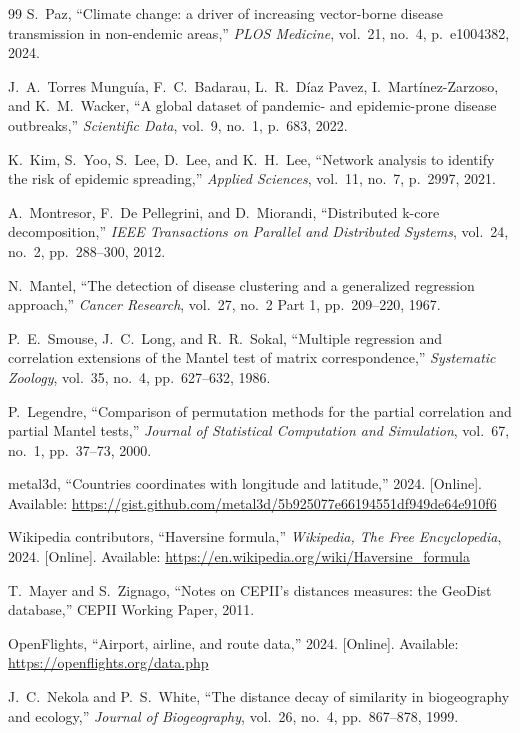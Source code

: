 \documentclass[11pt]{article}
\begin{document}
\begin{thebibliography}{99}
 S.~Paz, ``Climate change: a driver of increasing vector-borne disease
transmission in non-endemic areas,'' \emph{PLOS Medicine}, vol.~21, no.~4, p.~e1004382,
2024.

 J.~A.~Torres Mungu\'{i}a, F.~C.~Badarau, L.~R.~D\'{i}az Pavez,
I.~Mart\'{i}nez-Zarzoso, and K.~M.~Wacker, ``A global dataset of pandemic- and
epidemic-prone disease outbreaks,'' \emph{Scientific Data}, vol.~9, no.~1, p.~683, 2022.

 K.~Kim, S.~Yoo, S.~Lee, D.~Lee, and K.~H.~Lee, ``Network analysis to
identify the risk of epidemic spreading,'' \emph{Applied Sciences}, vol.~11, no.~7, p.~2997,
2021.

 A.~Montresor, F.~De Pellegrini, and D.~Miorandi, ``Distributed
k-core decomposition,'' \emph{IEEE Transactions on Parallel and Distributed Systems},
vol.~24, no.~2, pp.~288--300, 2012.

 N.~Mantel, ``The detection of disease clustering and a generalized
regression approach,'' \emph{Cancer Research}, vol.~27, no.~2 Part 1, pp.~209--220, 1967.

 P.~E.~Smouse, J.~C.~Long, and R.~R.~Sokal, ``Multiple regression and
correlation extensions of the Mantel test of matrix correspondence,'' \emph{Systematic
Zoology}, vol.~35, no.~4, pp.~627--632, 1986.

 P.~Legendre, ``Comparison of permutation methods for the partial
correlation and partial Mantel tests,'' \emph{Journal of Statistical Computation and
Simulation}, vol.~67, no.~1, pp.~37--73, 2000.

 metal3d, ``Countries coordinates with longitude and latitude,'' 2024.
[Online]. Available: \url{https://gist.github.com/metal3d/5b925077e66194551df949de64e910f6}

 Wikipedia contributors, ``Haversine formula,'' \emph{Wikipedia, The
Free Encyclopedia}, 2024. [Online]. Available:
\url{https://en.wikipedia.org/wiki/Haversine_formula}

 T.~Mayer and S.~Zignago, ``Notes on CEPII's distances measures: the
GeoDist database,'' CEPII Working Paper, 2011.

 OpenFlights, ``Airport, airline, and route data,'' 2024. [Online].
Available: \url{https://openflights.org/data.php}

 J.~C.~Nekola and P.~S.~White, ``The distance decay of similarity in
biogeography and ecology,'' \emph{Journal of Biogeography}, vol.~26, no.~4, pp.~867--878,
1999.

\end{thebibliography}
\end{document}
